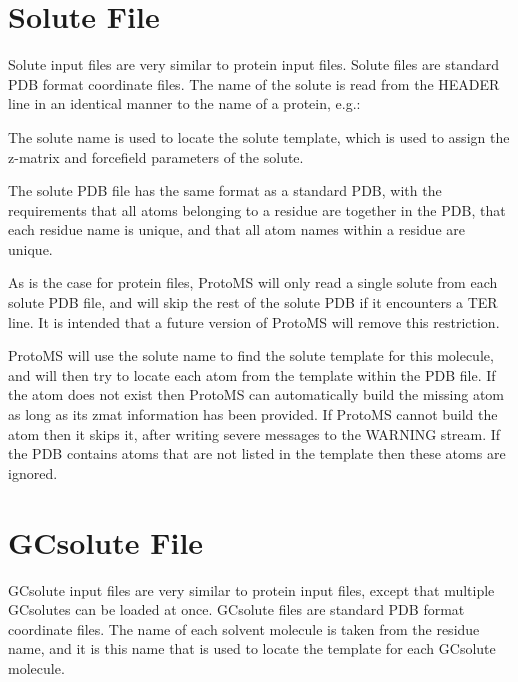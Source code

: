 \documentclass[letterpaper,10pt,english]{sphinxmanual}
\begin{document}
\section{Solute File}
\label{\detokenize{protoms:solpdb}}\label{\detokenize{protoms:solute-file}}
Solute input files are very similar to protein input files. Solute files are standard PDB format coordinate files. The name of the solute is read from the HEADER line in an identical manner to the name of a protein, e.g.:

%
\begin{sphinxVerbatim}[commandchars=\\\{\}]
 
\end{sphinxVerbatim}

The solute name is used to locate the solute template, which is used to assign the z-matrix and forcefield parameters of the solute.

The solute PDB file has the same format as a standard PDB, with the requirements that all atoms belonging to a residue are together in the PDB, that each residue name is unique, and that all atom names within a residue are unique.

As is the case for protein files, ProtoMS will only read a single solute from each solute PDB file, and will skip the rest of the solute PDB if it encounters a TER line. It is intended that a future version of ProtoMS will remove this restriction.

ProtoMS will use the solute name to find the solute template for this molecule, and will then try to locate each atom from the template within the PDB file. If the atom does not exist then ProtoMS can automatically build the missing atom as long as its zmat information has been provided. If ProtoMS cannot build the atom then it skips it, after writing severe messages to the WARNING stream. If the PDB contains atoms that are not listed in the template then these atoms are ignored.


\section{GCsolute File}
\label{\detokenize{protoms:gcpdb}}\label{\detokenize{protoms:gcsolute-file}}
GCsolute input files are very similar to protein input files, except that multiple GCsolutes can be loaded at once. GCsolute files are standard PDB format coordinate files. The name of each solvent molecule is taken from the residue name, and it is this name that is used to locate the template for each GCsolute molecule.
\end{document}
